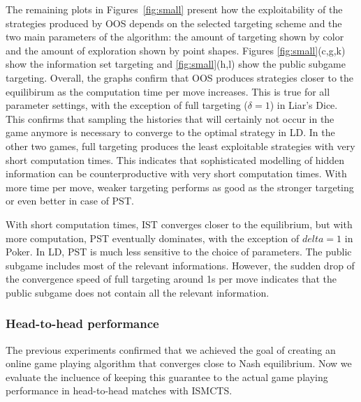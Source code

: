 \documentclass{aamas2015}
\begin{document}
The remaining plots in Figures~\ref{fig:small} present how the exploitability of the strategies produced by OOS depends on the selected targeting scheme and the two main parameters of the algorithm: the amount of targeting shown by color and the amount of exploration shown by point shapes. Figures \ref{fig:small}(c,g,k) show the information set targeting and \ref{fig:small}(h,l) show the public subgame targeting. Overall, the graphs confirm that OOS produces strategies closer to the equilibirum as the computation time per move increases. This is true for all parameter settings, with the exception of full targeting ($\delta=1$) in Liar's Dice. This confirms that sampling the histories that will certainly not occur in the game anymore is necessary to converge to the optimal strategy in LD.
In the other two games, full targeting produces the least exploitable strategies with very short computation times. This indicates that sophisticated modelling of hidden information can be counterproductive with very short computation times. With more time per move, weaker targeting performs as good as the stronger targeting or even better in case of PST.

With short computation times, IST converges closer to the equilibrium, but with more computation, PST eventually dominates, with the exception of $delta=1$ in Poker. In LD, PST is much less sensitive to the choice of parameters. The public subgame includes most of the relevant informations. However, the sudden drop of the convergence speed of full targeting around 1s per move indicates that the public subgame does not contain all the relevant information.


\subsubsection{Head-to-head performance}

 The previous experiments confirmed that we achieved the goal of creating an online game playing algorithm that converges close to Nash equilibrium. Now we evaluate the incluence of keeping this guarantee to the actual game playing performance in head-to-head matches with ISMCTS.
\end{document}
